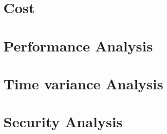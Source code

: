 \section{Cost}
\section{Performance Analysis}
\section{Time variance Analysis}
\section{Security Analysis}